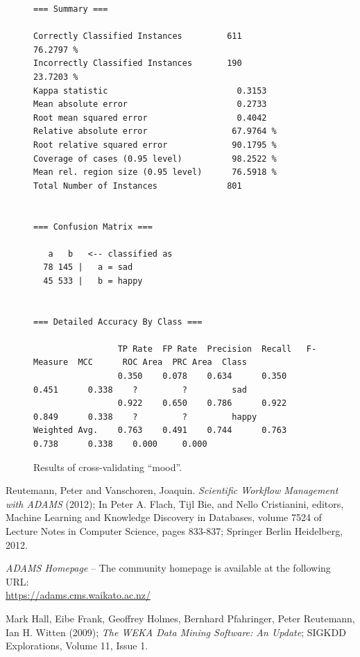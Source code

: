 \documentclass[a4paper,10pt]{book}
\begin{document}
\begin{figure}[htb]
  \centering
  {\scriptsize
  \begin{verbatim}
=== Summary ===

Correctly Classified Instances         611               76.2797 %
Incorrectly Classified Instances       190               23.7203 %
Kappa statistic                          0.3153
Mean absolute error                      0.2733
Root mean squared error                  0.4042
Relative absolute error                 67.9764 %
Root relative squared error             90.1795 %
Coverage of cases (0.95 level)          98.2522 %
Mean rel. region size (0.95 level)      76.5918 %
Total Number of Instances              801     


=== Confusion Matrix ===

   a   b   <-- classified as
  78 145 |   a = sad
  45 533 |   b = happy


=== Detailed Accuracy By Class ===

                 TP Rate  FP Rate  Precision  Recall   F-Measure  MCC      ROC Area  PRC Area  Class
                 0.350    0.078    0.634      0.350    0.451      0.338    ?         ?         sad
                 0.922    0.650    0.786      0.922    0.849      0.338    ?         ?         happy
Weighted Avg.    0.763    0.491    0.744      0.763    0.738      0.338    0.000     0.000     
  \end{verbatim}}
  \caption{Results of cross-validating ``mood''.}
  \label{crossvalidate_csv_archive-flow}
\end{figure}

\begin{thebibliography}{999}

		Reutemann, Peter and Vanschoren, Joaquin. 
		\textit{Scientific Workflow Management with ADAMS} (2012);
		In Peter A. Flach, Tijl Bie, and Nello Cristianini, editors, 
		Machine Learning and Knowledge Discovery in Databases, 
		volume 7524 of Lecture Notes in Computer Science, pages 
		833-837; Springer Berlin Heidelberg, 2012.

		\textit{ADAMS Homepage} -- The community homepage is available at the following URL: \\
		\url{https://adams.cms.waikato.ac.nz/}{}
		
	    Mark Hall, Eibe Frank, Geoffrey Holmes, Bernhard Pfahringer, Peter 
	    Reutemann, Ian H. Witten (2009); \textit{The WEKA Data Mining Software: An 
	    Update}; SIGKDD Explorations, Volume 11, Issue 1. 

\end{thebibliography}
\end{document}
